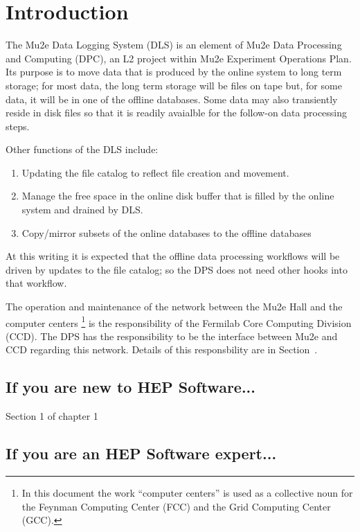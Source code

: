 \chapter{Introduction}

\label{ch:intro}

The Mu2e Data Logging System (DLS) is an element of Mu2e Data Processing
and Computing (DPC), an L2 project within Mu2e Experiment Operations Plan.
Its purpose is to move data
that is produced by the online system to long term storage;
for most data, the long term storage will be files on tape
but, for some data, it will be in one of the offline databases.
Some data may also transiently reside in disk files so that
it is readily avaialble for the follow-on data processing steps.

Other functions of the DLS include:
\begin{enumerate}
\item Updating the file catalog to reflect file creation and movement.
\item Manage the free space in the online disk buffer that is filled by the online system and drained by DLS.
\item Copy/mirror subsets of the online databases to the offline databases
\end{enumerate}

At this writing it is expected that the offline data processing workflows will be driven by updates to the file catalog;
so the DPS does not need other hooks into that workflow.

The operation and maintenance of the network between the Mu2e Hall and the computer centers
\footnote{
In this document the work ``computer centers'' is used as a collective noun for the Feynman Computing Center (FCC)
and the Grid Computing Center (GCC).
}
is the responsibility of the Fermilab Core Computing Division (CCD).
The DPS has the responsibility to be the interface between Mu2e and CCD regarding this network.
Details of this responsbility are in Section~.

\section{If you are new to HEP Software...}

Section 1 of chapter 1


\section{If you are an HEP Software expert...}

